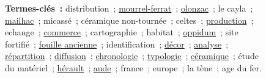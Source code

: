 \begin{figure}
{{          \textbf{Termes-clés~:} distribution~; \underline{mourrel-ferrat}~;
          \underline{olonzac}~; le cayla~; \underline{mailhac}~; micassé~;
          céramique non-tournée~; celtes~; \underline{production}~; echange~;
          \underline{commerce}~; cartographie~; habitat~; \underline{oppidum}~;
          site fortifié~; \underline{fouille ancienne}~; identification~;
          \underline{décor}~; \underline{analyse}~; \underline{répartition}~;
          \underline{diffusion}~; \underline{chronologie}~;
          \underline{typologie}~; \underline{céramique}~; étude du matériel~;
          \underline{hérault}~; \underline{aude}~; france~; europe~; la tène~;
          age du fer.
        }
      }
%
%
      ~\\~\\
\end{figure}
